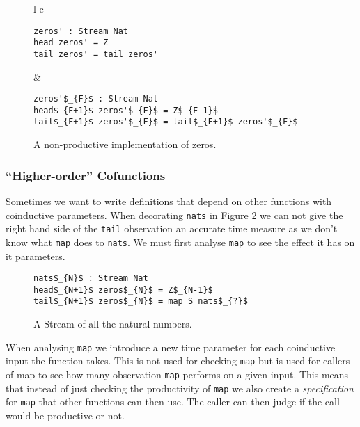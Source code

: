 \begin{figure}
\begin{tabular}{l c}
\begin{minipage}{3in}
\begin{Verbatim}[commandchars=\\\{\},codes={\catcode`$=3\catcode`_=8}]
zeros' : Stream Nat
head zeros' = Z
tail zeros' = tail zeros'
\end{Verbatim}
\end{minipage} &
\begin{minipage}{3in}
\begin{Verbatim}[commandchars=\\\{\},codes={\catcode`$=3\catcode`_=8}]
zeros'$_{F}$ : Stream Nat
head$_{F+1}$ zeros'$_{F}$ = Z$_{F-1}$
tail$_{F+1}$ zeros'$_{F}$ = tail$_{F+1}$ zeros'$_{F}$
\end{Verbatim}
\end{minipage}
\end{tabular}
\caption{A non-productive implementation of zeros.}
\label{fig:zerosprime}
\end{figure}

\subsubsection{``Higher-order'' Cofunctions}

Sometimes we want to write definitions that depend on other functions with coinductive parameters. When decorating \texttt{nats} in Figure \ref{fig:nats} we can not give the right hand side of the \texttt{tail} observation an accurate time measure as we don't know what \texttt{map} does to \texttt{nats}. We must first analyse \texttt{map} to see the effect it has on it parameters.

\begin{figure}
\begin{Verbatim}[commandchars=\\\{\},codes={\catcode`$=3\catcode`_=8}]
nats$_{N}$ : Stream Nat
head$_{N+1}$ zeros$_{N}$ = Z$_{N-1}$
tail$_{N+1}$ zeros$_{N}$ = map S nats$_{?}$
\end{Verbatim}
\caption{A Stream of all the natural numbers.}
\label{fig:nats}
\end{figure}

When analysing \texttt{map} we introduce a new time parameter for each coinductive input the function takes. This is not used for checking \texttt{map} but is used for callers of map to see how many observation \texttt{map} performs on a given input. This means that instead of just checking the productivity of \texttt{map} we also create a \textit{specification} for \texttt{map} that other functions can then use. The caller can then judge if the call would be productive or not.

